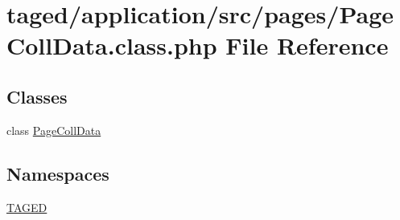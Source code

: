 \hypertarget{_page_coll_data_8class_8php}{}\section{taged/application/src/pages/\+Page\+Coll\+Data.class.\+php File Reference}
\label{_page_coll_data_8class_8php}
\subsection*{Classes}
\begin{DoxyCompactItemize}
\item 
class \hyperlink{class_page_coll_data}{Page\+Coll\+Data}
\end{DoxyCompactItemize}
\subsection*{Namespaces}
\begin{DoxyCompactItemize}
\item 
 \hyperlink{namespace_t_a_g_e_d}{T\+A\+G\+ED}
\end{DoxyCompactItemize}
